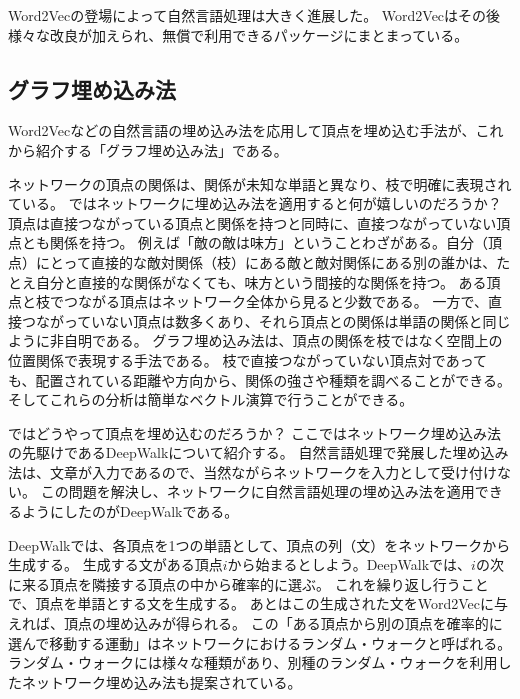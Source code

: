 \documentclass[J]{scitrans}
\begin{document}
Word2Vecの登場によって自然言語処理は大きく進展した。
Word2Vecはその後様々な改良が加えられ\cite{Levy2014,pennington-etal-2014-glove,joulin2016fasttext,Bojanowski2017}、無償で利用できるパッケージにまとまっている\cite{gensim}。

\subsection{グラフ埋め込み法}

Word2Vecなどの自然言語の埋め込み法を応用して頂点を埋め込む手法が、これから紹介する「グラフ埋め込み法」である。

ネットワークの頂点の関係は、関係が未知な単語と異なり、枝で明確に表現されている。
ではネットワークに埋め込み法を適用すると何が嬉しいのだろうか？
頂点は直接つながっている頂点と関係を持つと同時に、直接つながっていない頂点とも関係を持つ。
例えば「敵の敵は味方」ということわざがある。自分（頂点）にとって直接的な敵対関係（枝）にある敵と敵対関係にある別の誰かは、たとえ自分と直接的な関係がなくても、味方という間接的な関係を持つ。
ある頂点と枝でつながる頂点はネットワーク全体から見ると少数である。
一方で、直接つながっていない頂点は数多くあり、それら頂点との関係は単語の関係と同じように非自明である。
グラフ埋め込み法は、頂点の関係を枝ではなく空間上の位置関係で表現する手法である。
枝で直接つながっていない頂点対であっても、配置されている距離や方向から、関係の強さや種類を調べることができる。
そしてこれらの分析は簡単なベクトル演算で行うことができる。

ではどうやって頂点を埋め込むのだろうか？
ここではネットワーク埋め込み法の先駆けであるDeepWalkについて紹介する。
自然言語処理で発展した埋め込み法は、文章が入力であるので、当然ながらネットワークを入力として受け付けない。
この問題を解決し、ネットワークに自然言語処理の埋め込み法を適用できるようにしたのがDeepWalk\cite{Bryan2014}である。

DeepWalkでは、各頂点を1つの単語として、頂点の列（文）をネットワークから生成する。
生成する文がある頂点$i$から始まるとしよう。DeepWalkでは、$i$の次に来る頂点を隣接する頂点の中から確率的に選ぶ。
これを繰り返し行うことで、頂点を単語とする文を生成する。
あとはこの生成された文をWord2Vecに与えれば、頂点の埋め込みが得られる。
この「ある頂点から別の頂点を確率的に選んで移動する運動」はネットワークにおけるランダム・ウォークと呼ばれる。
ランダム・ウォークには様々な種類があり、別種のランダム・ウォークを利用したネットワーク埋め込み法も提案されている\cite{Grover2016,Dong2017}。
\end{document}
